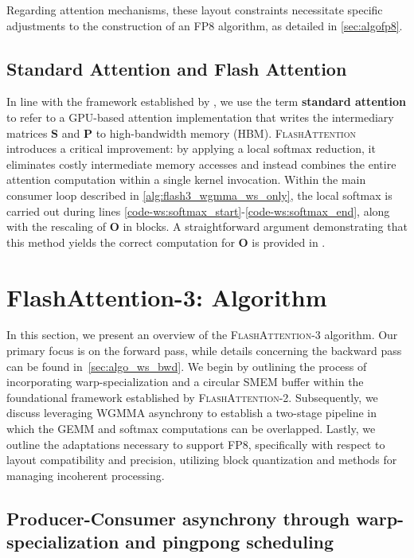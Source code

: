 \begin{enumerate}
Regarding attention mechanisms, these layout constraints necessitate specific adjustments to the construction of an FP8 algorithm, as detailed in \cref{sec:algofp8}.

\subsection{Standard Attention and Flash Attention} In line with the framework established by \citet{dao2022flashattention}, we use the term \textbf{standard attention} to refer to a GPU-based attention implementation that writes the intermediary matrices $\mathbf{S}$ and $\mathbf{P}$ to high-bandwidth memory (HBM). \textsc{FlashAttention} introduces a critical improvement: by applying a local softmax reduction, it eliminates costly intermediate memory accesses and instead combines the entire attention computation within a single kernel invocation. Within the main consumer loop described in \cref{alg:flash3_wgmma_ws_only}, the local softmax is carried out during lines \ref{code-ws:softmax_start}-\ref{code-ws:softmax_end}, along with the rescaling of $\mathbf{O}$ in blocks. A straightforward argument demonstrating that this method yields the correct computation for $\mathbf{O}$ is provided in \cite[\S 2.3.1]{dao2023flashattention2}.

\section{FlashAttention-3: Algorithm}
\label{sec:algo}

In this section, we present an overview of the \textsc{FlashAttention-3} algorithm. Our primary focus is on the forward pass, while details concerning the backward pass can be found in~\cref{sec:algo_ws_bwd}. We begin by outlining the process of incorporating warp-specialization and a circular SMEM buffer within the foundational framework established by \textsc{FlashAttention-2}. Subsequently, we discuss leveraging WGMMA asynchrony to establish a two-stage pipeline in which the GEMM and softmax computations can be overlapped. Lastly, we outline the adaptations necessary to support FP8, specifically with respect to layout compatibility and precision, utilizing block quantization and methods for managing incoherent processing.

\subsection{Producer-Consumer asynchrony through warp-specialization and pingpong scheduling}
\label{sec:algo_ws}


\end{enumerate}
